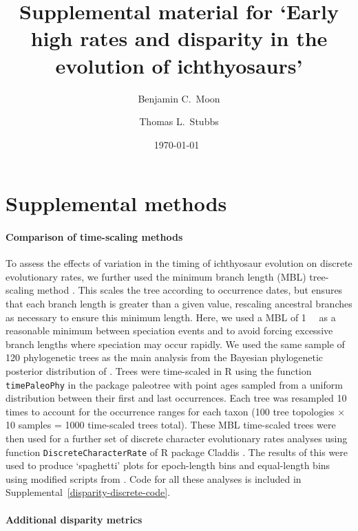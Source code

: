 \documentclass[british,a4paper]{article}
\title{Supplemental material for `Early high rates and disparity in the
evolution of ichthyosaurs'}
\author{Benjamin C.\ Moon \and Thomas L.\ Stubbs}
\date{\today~\version}
\begin{document}
\maketitle

\tableofcontents

\section{Supplemental methods}\label{supplemental-methods}

\paragraph{Comparison of time-scaling methods}\label{comparison-of-time-scaling-methods}

To assess the effects of variation in the timing of ichthyosaur evolution on
discrete evolutionary rates, we further used the minimum branch length (MBL)
tree-scaling method \autocite{Bapst2012MEE, Laurin2004SB}. This scales the
tree according to occurrence dates, but ensures that each branch length is
greater than a given value, rescaling ancestral branches as necessary to ensure
this minimum length. Here, we used a MBL of \SI{1}{\mega\annum} as a reasonable
minimum between speciation events and to avoid forcing excessive branch lengths
where speciation may occur rapidly. We used the same sample of 120 phylogenetic
trees as the main analysis from the Bayesian phylogenetic posterior distribution
of \textcite{Moon2018JSP}. Trees were time-scaled in R \autocite{RCoreTeam2019} using the
function \texttt{timePaleoPhy} in the package paleotree \autocite{Bapst2012MEE}
with point ages sampled from a uniform distribution between their first and last
occurrences. Each tree was resampled 10 times to account for the occurrence
ranges for each taxon (100 tree topologies × 10 samples = 1000 time-scaled trees
total). These MBL time-scaled trees were then used for a further set of discrete
character evolutionary rates analyses using function
\texttt{DiscreteCharacterRate} of R package Claddis \autocite{Lloyd2016BJLS}. The
results of this were used to produce `spaghetti' plots for epoch-length bins and
equal-length bins using modified scripts from \textcite{Close2015CB}. Code for
all these analyses is included in Supplemental~\ref{disparity-discrete-code}.

\paragraph{Additional disparity metrics}
\end{document}
